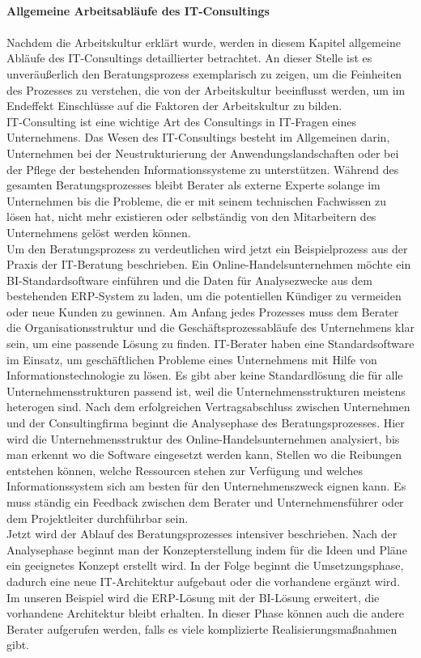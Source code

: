 	\\
\textbf{Allgemeine Arbeitsabläufe des IT-Consultings}\\ \\
	Nachdem die Arbeitskultur erklärt wurde, werden in diesem Kapitel allgemeine Abläufe des IT-Consultings detaillierter betrachtet. An dieser Stelle ist es unveräußerlich den Beratungsprozess exemplarisch zu zeigen, um die Feinheiten des Prozesses zu verstehen, die von der Arbeitskultur beeinflusst werden, um im Endeffekt Einschlüsse auf die Faktoren der Arbeitskultur zu bilden.\\ 
	IT-Consulting ist eine wichtige Art des Consultings in IT-Fragen eines Unternehmens. Das Wesen des IT-Consultings besteht im Allgemeinen darin, Unternehmen bei der Neustrukturierung der Anwendungslandschaften oder bei der Pflege der bestehenden Informationssysteme zu unterstützen. Während des gesamten Beratungsprozesses bleibt Berater als externe Experte solange im Unternehmen bis die Probleme, die er mit seinem technischen Fachwissen zu lösen hat, nicht mehr existieren oder selbständig von den Mitarbeitern des Unternehmens gelöst werden können.\\
	Um den Beratungsprozess zu verdeutlichen wird jetzt ein Beispielprozess aus der Praxis der IT-Beratung beschrieben. Ein Online-Handelsunternehmen möchte ein BI-Standardsoftware einführen und die Daten für Analysezwecke aus dem bestehenden ERP-System zu laden, um die potentiellen Kündiger zu vermeiden oder neue Kunden zu gewinnen. Am Anfang jedes Prozesses muss dem Berater die Organisationsstruktur und die Geschäftsprozessabläufe des Unternehmens klar sein, um eine passende Lösung zu finden. IT-Berater haben eine Standardsoftware im Einsatz, um geschäftlichen Probleme eines Unternehmens mit Hilfe von Informationstechnologie zu lösen. Es gibt aber keine Standardlösung die für alle Unternehmensstrukturen passend ist, weil die Unternehmensstrukturen meistens heterogen sind. Nach dem erfolgreichen Vertragsabschluss zwischen Unternehmen und der Consultingfirma beginnt die Analysephase des Beratungsprozesses. Hier wird die Unternehmensstruktur des Online-Handelsunternehmen analysiert, bis man erkennt wo die Software eingesetzt werden kann, Stellen wo die Reibungen entstehen können, welche Ressourcen stehen zur Verfügung und welches Informationssystem sich am besten für den Unternehmenszweck eignen kann. Es muss ständig ein Feedback zwischen dem Berater und Unternehmensführer oder dem Projektleiter durchführbar sein.\\
	Jetzt wird der Ablauf des Beratungsprozesses intensiver beschrieben. Nach der Analysephase beginnt man der Konzepterstellung indem für die Ideen und Pläne ein geeignetes Konzept erstellt wird. In der Folge beginnt die Umsetzungsphase, dadurch eine neue IT-Architektur aufgebaut oder die vorhandene ergänzt wird. Im unseren Beispiel wird die ERP-Lösung mit der BI-Lösung erweitert, die vorhandene Architektur bleibt erhalten. In dieser Phase können auch die andere Berater aufgerufen werden, falls es viele komplizierte Realisierungsmaßnahmen gibt.
